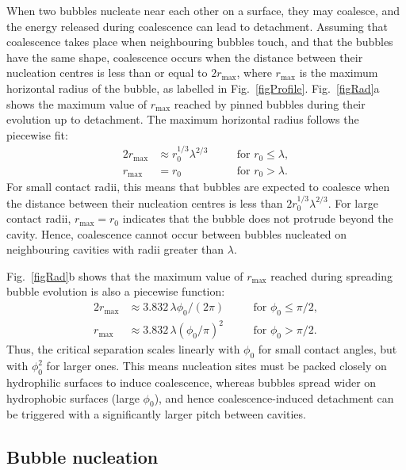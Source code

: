 \documentclass[9pt]{extarticle}
\begin{document}
When two bubbles nucleate near each other on a surface, they may coalesce, and the energy released during coalescence can lead to detachment\cite{demirkir25jump}. Assuming that coalescence takes place when neighbouring bubbles touch, and that the bubbles have the same shape, coalescence occurs when the distance between their nucleation centres is less than or equal to $2r_\mathrm{max}$\cite{raman25electrolytic}, where $r_\mathrm{max}$ is the maximum horizontal radius of the bubble, as labelled in Fig.~\ref{figProfile}. Fig.~\ref{figRad}a shows the maximum value of $r_\mathrm{max}$ reached by pinned bubbles during their evolution up to detachment. The maximum horizontal radius follows the piecewise fit:
\begin{alignat}{2}
r_\mathrm{max} &\approx r_0^{1/3}\lambda^{2/3} \quad &&\text{for } r_0 \le \lambda, \\
r_\mathrm{max} &= r_0 \quad &&\text{for } r_0 > \lambda.
\end{alignat}
For small contact radii, this means that bubbles are expected to coalesce when the distance between their nucleation centres is less than $2r_0^{1/3}\lambda^{2/3}$. For large contact radii, $r_\mathrm{max}=r_0$ indicates that the bubble does not protrude beyond the cavity. Hence, coalescence cannot occur between bubbles nucleated on neighbouring cavities with radii greater than $\lambda$.

Fig.~\ref{figRad}b shows that the maximum value of $r_\mathrm{max}$ reached during spreading bubble evolution is also a piecewise function:
\begin{alignat}{2}
r_\mathrm{max} &\approx 3.832\,\lambda\phi_0/(2\pi) \quad &&\text{for } \phi_0 \le \pi/2, \\
r_\mathrm{max} &\approx 3.832\,\lambda\left(\phi_0/\pi\right)^2 \quad &&\text{for } \phi_0 > \pi/2.
\end{alignat}
Thus, the critical separation scales linearly with $\phi_0$ for small contact angles, but with $\phi_0^2$ for larger ones. This means nucleation sites must be packed closely on hydrophilic surfaces to induce coalescence, whereas bubbles spread wider on hydrophobic surfaces (large $\phi_0$), and hence coalescence-induced detachment can be triggered with a significantly larger pitch between cavities.

\subsection{Bubble nucleation}\label{secNuc}
\end{document}
